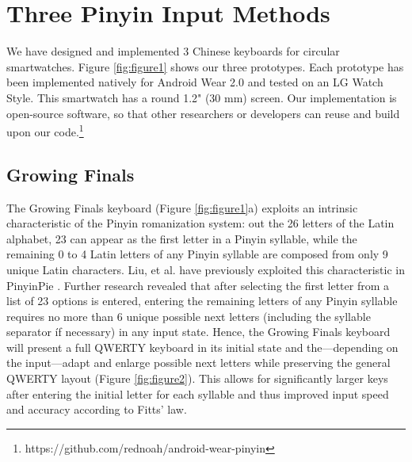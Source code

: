 \chapter{Three Pinyin Input Methods}
\label{c:prototypes}


We have designed and implemented 3 Chinese keyboards for circular smartwatches. Figure \ref{fig:figure1} shows our three prototypes. Each prototype has been implemented natively for Android Wear 2.0 and tested on an LG Watch Style. This smartwatch has a round 1.2" (30 mm) screen. Our implementation is open-source software, so that other researchers or developers can reuse and build upon our code.\footnote{https://github.com/rednoah/android-wear-pinyin}




\section{Growing Finals}
The Growing Finals keyboard (Figure \ref{fig:figure1}a) exploits an intrinsic characteristic of the Pinyin romanization system: out the 26 letters of the Latin alphabet, 23 can appear as the first letter in a Pinyin syllable, while the remaining 0 to 4 Latin letters of any Pinyin syllable are composed from only 9 unique Latin characters. Liu, et al. have previously exploited this characteristic in PinyinPie \cite{Liu:2012:PPM:2371574.2371614}.
Further research revealed that after selecting the first letter from a list of 23 options is entered, entering the remaining letters of any Pinyin syllable requires no more than 6 unique possible next letters (including the syllable separator \' if necessary) in any input state.
Hence, the Growing Finals keyboard will present a full QWERTY keyboard in its initial state and the---depending on the input---adapt and enlarge possible next letters while preserving the general QWERTY layout (Figure \ref{fig:figure2}). This allows for significantly larger keys after entering the initial letter for each syllable and thus improved input speed and accuracy according to Fitts' law.





